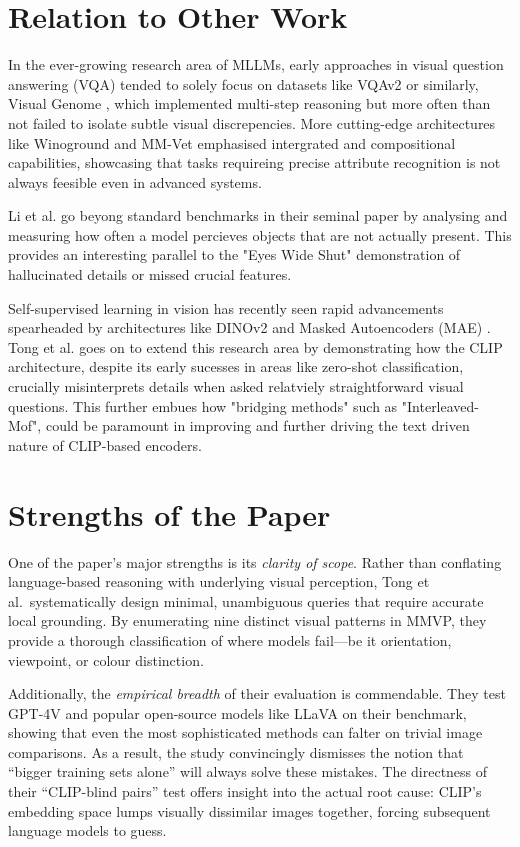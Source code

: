 \documentclass[11pt]{article}
\begin{document}
\section*{Relation to Other Work}

In the ever-growing research area of MLLMs, early approaches in visual question answering (VQA) tended to solely focus on datasets like VQAv2 \cite{Goyal2017CVPR} or similarly, Visual Genome \cite{Krishna2017IJCV_VisualGenome}, which implemented multi-step reasoning but more often than not failed to isolate subtle visual discrepencies.
More cutting-edge architectures like Winoground \cite{Thrush2022CVPR_Winoground} and MM-Vet \cite{Yu2023Arxiv_MMVet} emphasised intergrated and compositional capabilities, showcasing that tasks requireing precise attribute recognition is not always feesible even in advanced systems.

Li et al. go beyong standard benchmarks in their seminal paper \cite{Li2023Arxiv_POPE} by analysing and measuring how often a model percieves objects that are not actually present. This provides an interesting parallel to the "Eyes Wide Shut" demonstration of hallucinated details or missed crucial features.

Self-supervised learning in vision has recently seen rapid advancements spearheaded by architectures like DINOv2 \cite{Oquab2023DINOv2} and Masked Autoencoders (MAE) \cite{He2022CVPR_MAE}. 
Tong et al. goes on to extend this research area by demonstrating how the CLIP architecture, despite its early sucesses in areas like zero-shot classification, crucially misinterprets details when asked relatviely straightforward visual questions.
This further embues how "bridging methods" such as "Interleaved-Mof", could be paramount in improving and further driving the text driven nature of CLIP-based encoders.

\section*{Strengths of the Paper}
One of the paper's major strengths is its \emph{clarity of scope}. Rather than conflating language-based reasoning with underlying visual perception, Tong et al.\ systematically design minimal, unambiguous queries that require accurate local grounding. By enumerating nine distinct visual patterns in MMVP, they provide a thorough classification of where models fail---be it orientation, viewpoint, or colour distinction.

Additionally, the \emph{empirical breadth} of their evaluation is commendable. They test GPT-4V \cite{OpenAI2023GPT4} and popular open-source models like LLaVA on their benchmark, showing that even the most sophisticated methods can falter on trivial image comparisons. As a result, the study convincingly dismisses the notion that ``bigger training sets alone'' will always solve these mistakes. The directness of their ``CLIP-blind pairs'' test offers insight into the actual root cause: CLIP's embedding space lumps visually dissimilar images together, forcing subsequent language models to guess.
\end{document}
